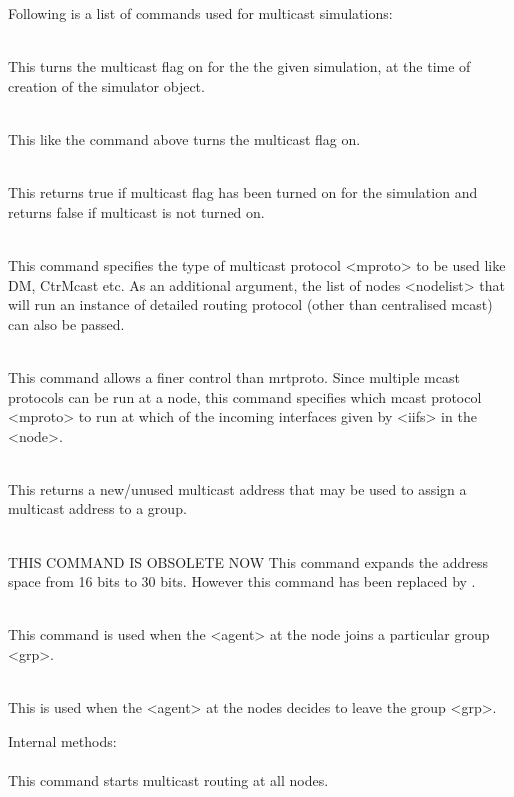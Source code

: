 Following is a list of commands used for multicast simulations:
\begin{flushleft}
\\
This turns the multicast flag on for the the given simulation, at the time of
creation of the simulator object.


\\
This like the command above turns the multicast flag on.


\\
This returns true if multicast flag has been turned on for the simulation
and returns false if multicast is not turned on.


\\
This command specifies the type of multicast protocol <mproto> to be used
like DM, CtrMcast etc. As an additional argument, the list of nodes <nodelist>
that will run an instance of detailed routing protocol (other than
centralised mcast) can also be passed.


\\
This command allows a finer control than mrtproto. Since multiple mcast
protocols can be run at a node, this command specifies which mcast protocol
<mproto> to run at which of the incoming interfaces given by <iifs> in the <node>.


\\
This returns a new/unused multicast address that may be used to assign a multicast
address to a group.


\\
THIS COMMAND IS OBSOLETE NOW
This command expands the address space from 16 bits to 30 bits. However this
command has been replaced by .


\\
This command is used when the <agent> at the node joins a particular group <grp>.


\\
This is used when the <agent> at the nodes decides to leave the group <grp>.

Internal methods:\\

\\
This command starts multicast routing at all nodes. 



\end{flushleft}
